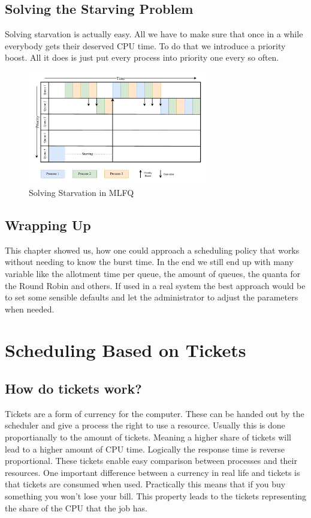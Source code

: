 \section{Solving the Starving Problem}

Solving starvation is actually easy.
All we have to make sure that once in a while everybody gets their deserved CPU time.
To do that we introduce a priority boost. All it does is just put every process into priority one every so often.

\begin{figure}[h]
    \centering
    \includegraphics[width=0.7\textwidth]{Assets/MLFQ-Example-4.pdf}
    \caption{Solving Starvation in MLFQ}
    \label{fig:mlfq-example-4}
\end{figure}

\section{Wrapping Up}

This chapter showed us, how one could approach a scheduling policy that works without needing to know the burst time.
In the end we still end up with many variable like the allotment time per queue, the amount of queues, the quanta for the Round Robin and others.
If used in a real system the best approach would be to set some sensible defaults and let the administrator to adjust the parameters when needed.

\chapter{Scheduling Based on Tickets}

\section{How do tickets work?}

Tickets are a form of currency for the computer.
These can be handed out by the scheduler and give a process the right to use a resource.
Usually this is done proportianally to the amount of tickets.
Meaning a higher share of tickets will lead to a higher amount of CPU time.
Logically the response time is reverse proportional.
These tickets enable easy comparison between processes and their resources.
One important difference between a currency in real life and tickets is that tickets are consumed when used.
Practically this means that if you buy something you won't lose your bill.
This property leads to the tickets representing the share of the CPU that the job has.

